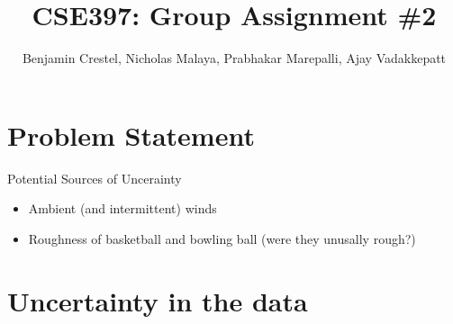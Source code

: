\documentclass{article}
\title{\bf{CSE397: Group Assignment \#2}}
\author{Benjamin Crestel, Nicholas Malaya, Prabhakar Marepalli, Ajay Vadakkepatt}
\date{}
\begin{document}
\maketitle

\newpage
\section{Problem Statement}

Potential Sources of Uncerainty
\begin{itemize}
\item Ambient (and intermittent) winds
\item Roughness of basketball and bowling ball (were they unusally rough?)
\end{itemize}

\section{Uncertainty in the data}
\end{document}

